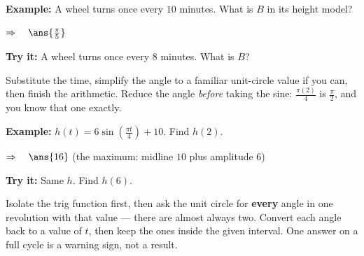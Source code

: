 \documentclass[12pt]{article}
\begin{document}
\begin{examplebox}
\textbf{Example:} \quad A wheel turns once every $10$ minutes. What is $B$ in
its height model?

$\Rightarrow\quad \ans{\frac{\pi}{5}}$
\end{examplebox}

\begin{tryitbox}
\textbf{Try it:} \quad A wheel turns once every $8$ minutes. What is $B$?\\[2pt]
\end{tryitbox}


\begin{formulabox}
Substitute the time, simplify the angle to a familiar unit-circle value if you
can, then finish the arithmetic. Reduce the angle \emph{before} taking the
sine: $\frac{\pi(2)}{4}$ is $\frac{\pi}{2}$, and you know that one exactly.
\end{formulabox}

\begin{examplebox}
\textbf{Example:} \quad $h(t) = 6\sin\!\left(\frac{\pi t}{4}\right) + 10$.
Find $h(2)$.

$\Rightarrow\quad \ans{16}$ \quad (the maximum: midline $10$ plus amplitude
$6$)
\end{examplebox}

\begin{tryitbox}
\textbf{Try it:} \quad Same $h$. Find $h(6)$.\\[2pt]
\end{tryitbox}


\begin{formulabox}
Isolate the trig function first, then ask the unit circle for \textbf{every}
angle in one revolution with that value --- there are almost always two.
Convert each angle back to a value of $t$, then keep the ones inside the given
interval. One answer on a full cycle is a warning sign, not a result.
\end{formulabox}
\end{document}
